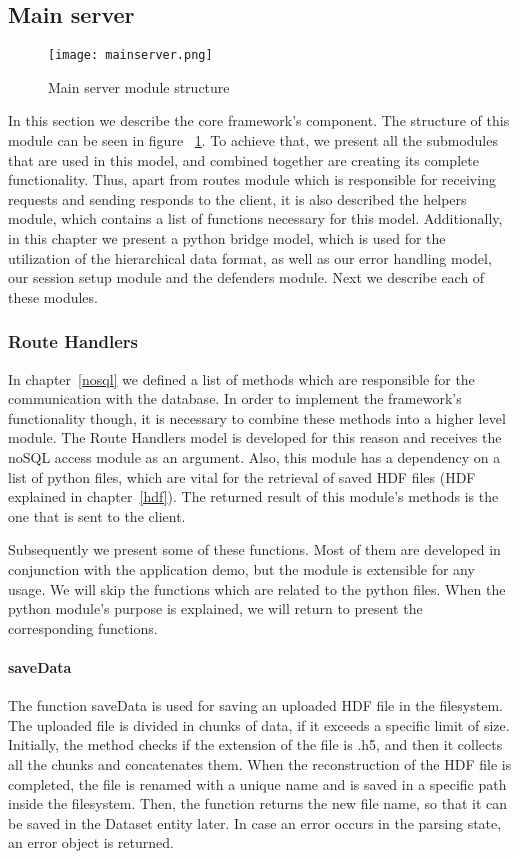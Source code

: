 \subsection{Main server}
\begin{figure}
	\centerline{\texttt{[image: mainserver.png]}}
	\caption{Main server module structure}
	\label{mainserver}
\end{figure}
In this section we describe the core framework's component.  The structure of this module can be seen in figure ~\ref{mainserver}. To achieve that, we present all the submodules that are used in this model, and combined together are creating its complete functionality. Thus, apart from routes module which is responsible for receiving requests and sending responds to the client, it is also described the helpers module, which contains a list of functions necessary for this model. Additionally, in this chapter we present a python bridge model, which is used for the utilization of the hierarchical data format, as well as our error handling model, our session setup module and the defenders module. Next we describe each of these modules.

\subsubsection{Route Handlers}
\label{helpers}
In chapter~\ref{nosql} we defined a list of methods which are responsible for the communication with the database. In order to implement the framework's functionality though, it is necessary to combine these methods into a higher level module. The Route Handlers model is developed for this reason and receives the noSQL access module as an argument. Also, this module has a dependency on a list of python files, which are vital for the retrieval of saved HDF files (HDF explained in chapter~\ref{hdf}). The returned result of this module's methods is the one that is sent to the client. \par
	Subsequently we present some of these functions. Most of them are developed in conjunction with the application demo, but the module is extensible for any usage. We will skip the functions which are related to the python files. When the python module's purpose is explained, we will return to present the corresponding functions.

\paragraph{saveData}
The function saveData is used for saving an uploaded HDF file in the filesystem. The uploaded file is divided in chunks of data, if it exceeds a specific limit of size. Initially, the method checks if the extension of the file is .h5, and then it collects all the chunks and concatenates them. When the reconstruction of the HDF file is completed, the file is renamed with a unique name and is saved in a specific path inside the filesystem. Then, the function returns the new file name, so that it can be saved in the Dataset entity later. In case an error occurs in the parsing state, an error object is returned.


